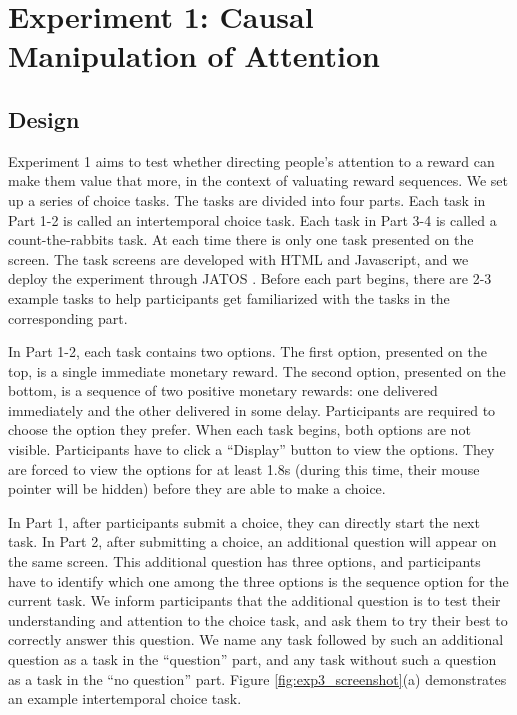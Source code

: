 \documentclass[
  12pt,
]{article}
\begin{document}
\hypertarget{experiment-1-causal-manipulation-of-attention}{%
\section{Experiment 1: Causal Manipulation of
Attention}\label{experiment-1-causal-manipulation-of-attention}}

\hypertarget{design}{%
\subsection{Design}\label{design}}

Experiment 1 aims to test whether directing people's attention to a
reward can make them value that more, in the context of valuating reward
sequences. We set up a series of choice tasks. The tasks are divided
into four parts. Each task in Part 1-2 is called an intertemporal choice
task. Each task in Part 3-4 is called a count-the-rabbits task. At each
time there is only one task presented on the screen. The task screens
are developed with HTML and Javascript, and we deploy the experiment
through JATOS \citep{lange2015just}. Before each part begins, there are
2-3 example tasks to help participants get familiarized with the tasks
in the corresponding part.

In Part 1-2, each task contains two options. The first option, presented
on the top, is a single immediate monetary reward. The second option,
presented on the bottom, is a sequence of two positive monetary rewards:
one delivered immediately and the other delivered in some delay.
Participants are required to choose the option they prefer. When each
task begins, both options are not visible. Participants have to click a
``Display'' button to view the options. They are forced to view the
options for at least 1.8s (during this time, their mouse pointer will be
hidden) before they are able to make a choice.

In Part 1, after participants submit a choice, they can directly start
the next task. In Part 2, after submitting a choice, an additional
question will appear on the same screen. This additional question has
three options, and participants have to identify which one among the
three options is the sequence option for the current task. We inform
participants that the additional question is to test their understanding
and attention to the choice task, and ask them to try their best to
correctly answer this question. We name any task followed by such an
additional question as a task in the ``question'' part, and any task
without such a question as a task in the ``no question'' part. Figure
\ref{fig:exp3_screenshot}(a) demonstrates an example intertemporal
choice task.
\end{document}
